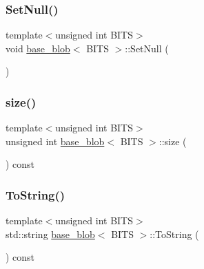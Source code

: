 \mbox{\label{classbase__blob_aa340be5328d911272eded433d03f30a3}} 
\subsubsection{\texorpdfstring{Set\+Null()}{SetNull()}}
{\footnotesize\ttfamily template$<$unsigned int B\+I\+TS$>$ \\
void \mbox{\hyperlink{classbase__blob}{base\+\_\+blob}}$<$ B\+I\+TS $>$\+::Set\+Null (\begin{DoxyParamCaption}{ }\end{DoxyParamCaption})\hspace{0.3cm}{\ttfamily [inline]}}

\mbox{\label{classbase__blob_a00e7426a5d1ada51c635debf85f5a810}} 
\subsubsection{\texorpdfstring{size()}{size()}}
{\footnotesize\ttfamily template$<$unsigned int B\+I\+TS$>$ \\
unsigned int \mbox{\hyperlink{classbase__blob}{base\+\_\+blob}}$<$ B\+I\+TS $>$\+::size (\begin{DoxyParamCaption}{ }\end{DoxyParamCaption}) const\hspace{0.3cm}{\ttfamily [inline]}}

\mbox{\label{classbase__blob_a7a0d25782830d8b087c4da839f3ccdeb}} 
\subsubsection{\texorpdfstring{To\+String()}{ToString()}}
{\footnotesize\ttfamily template$<$unsigned int B\+I\+TS$>$ \\
std\+::string \mbox{\hyperlink{classbase__blob}{base\+\_\+blob}}$<$ B\+I\+TS $>$\+::To\+String (\begin{DoxyParamCaption}{ }\end{DoxyParamCaption}) const}

